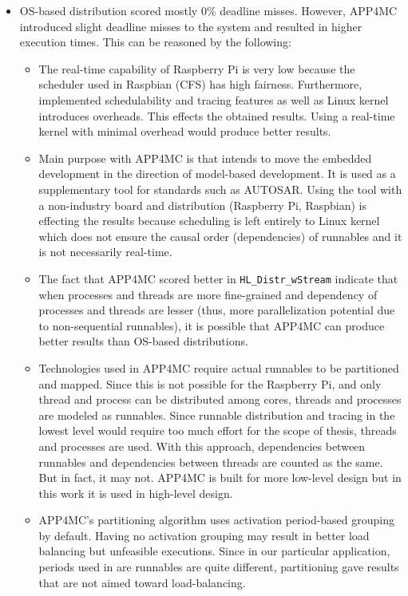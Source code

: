 \begin{itemize}
	\item OS-based distribution scored mostly 0\% deadline misses. However, APP4MC introduced slight deadline misses to the system and resulted in higher execution times. This can be reasoned by the following:
	\begin{itemize}
		\item The real-time capability of Raspberry Pi is very low because the scheduler used in Raspbian (CFS) has high fairness. Furthermore, implemented schedulability and tracing features as well as Linux kernel introduces overheads. This effects the  obtained results. Using a real-time kernel with minimal overhead would produce better results.
		\item Main purpose with APP4MC is that intends to move the embedded development in the direction of model-based development. It is used as a supplementary tool for standards such as AUTOSAR. Using the tool with a non-industry board and distribution (Raspberry Pi, Raspbian) is effecting the results because scheduling is left entirely to Linux kernel which does not ensure the causal order (dependencies) of runnables and it is not necessarily real-time.
		\item The fact that APP4MC scored better in \texttt{HL{\_}Distr{\_}wStream} indicate that when processes and threads are more fine-grained and dependency of processes and threads are lesser (thus, more parallelization potential due to non-sequential runnables), it is possible that APP4MC can produce better results than OS-based distributions.
		\item Technologies used in APP4MC require actual runnables to be partitioned and mapped. Since this is not possible for the Raspberry Pi, and only thread and process can be distributed among cores, threads and processes are modeled as runnables. Since runnable distribution and tracing in the lowest level would require too much effort for the scope of thesis, threads and processes are used. With this approach, dependencies between runnables and dependencies between threads are counted as the same. But in fact, it may not. APP4MC is built for more low-level design but in this work it is used in high-level design.
		\item APP4MC's partitioning algorithm uses activation period-based grouping by default. Having no activation grouping may result in better load balancing but unfeasible executions. Since in our particular application, periods used in are runnables are quite different, partitioning gave results that are not aimed toward load-balancing.

\end{itemize}
\end{itemize}
